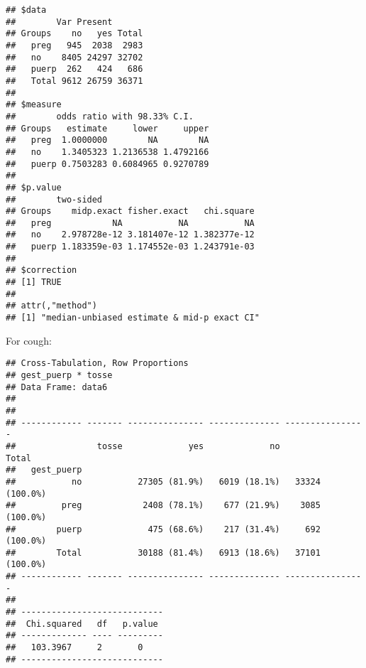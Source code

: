 \documentclass[
]{article}
\newenvironment{Shaded}{\begin{snugshade}}{\end{snugshade}}
\newcommand{\DataTypeTok}[1]{\textcolor[rgb]{0.13,0.29,0.53}{#1}}
\newcommand{\KeywordTok}[1]{\textcolor[rgb]{0.13,0.29,0.53}{\textbf{#1}}}
\newcommand{\NormalTok}[1]{#1}
\newcommand{\OperatorTok}[1]{\textcolor[rgb]{0.81,0.36,0.00}{\textbf{#1}}}
\newcommand{\OtherTok}[1]{\textcolor[rgb]{0.56,0.35,0.01}{#1}}
\newcommand{\StringTok}[1]{\textcolor[rgb]{0.31,0.60,0.02}{#1}}
\begin{document}
\begin{verbatim}
## $data
##        Var Present
## Groups    no   yes Total
##   preg   945  2038  2983
##   no    8405 24297 32702
##   puerp  262   424   686
##   Total 9612 26759 36371
## 
## $measure
##        odds ratio with 98.33% C.I.
## Groups   estimate     lower     upper
##   preg  1.0000000        NA        NA
##   no    1.3405323 1.2136538 1.4792166
##   puerp 0.7503283 0.6084965 0.9270789
## 
## $p.value
##        two-sided
## Groups    midp.exact fisher.exact   chi.square
##   preg            NA           NA           NA
##   no    2.978728e-12 3.181407e-12 1.382377e-12
##   puerp 1.183359e-03 1.174552e-03 1.243791e-03
## 
## $correction
## [1] TRUE
## 
## attr(,"method")
## [1] "median-unbiased estimate & mid-p exact CI"
\end{verbatim}

For cough:

\begin{Shaded}
\end{Shaded}

\begin{verbatim}
## Cross-Tabulation, Row Proportions  
## gest_puerp * tosse  
## Data Frame: data6  
## 
## 
## ------------ ------- --------------- -------------- ----------------
##                tosse             yes             no            Total
##   gest_puerp                                                        
##           no           27305 (81.9%)   6019 (18.1%)   33324 (100.0%)
##         preg            2408 (78.1%)    677 (21.9%)    3085 (100.0%)
##        puerp             475 (68.6%)    217 (31.4%)     692 (100.0%)
##        Total           30188 (81.4%)   6913 (18.6%)   37101 (100.0%)
## ------------ ------- --------------- -------------- ----------------
## 
## ----------------------------
##  Chi.squared   df   p.value 
## ------------- ---- ---------
##   103.3967     2       0    
## ----------------------------
\end{verbatim}

\begin{Shaded}
\end{Shaded}
\end{document}
